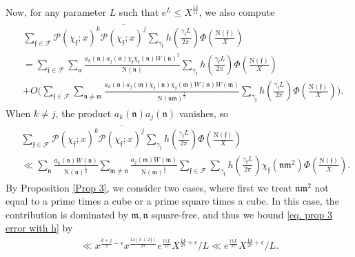 \documentclass[11pt]{amsart}
\def\n{\mathfrak{n}}
\def\m{\mathfrak{m}}
\newcommand{\norm}{\mathrm{N}}
\numberwithin{equation}{section}
\theoremstyle{remark}
\begin{document}
Now, for any parameter $L$ such that $e^L\le X^{\frac{13}{11}}$, we also compute
\begin{align}\label{eq. Pkpj with h}
\begin{split}
&\sum_{\mathfrak{f}\in\mathcal{F}} \mathcal{P}(\chi_\mathfrak{f}; x)^{k}\overline{\mathcal{P}(\chi_\mathfrak{f}; x)^{j}} 
\sum_{\gamma_\mathfrak{f}} h\left(\frac{\gamma_\mathfrak{f} L}{2\pi}\right) \Phi\left(\frac{\norm(\mathfrak{f})}{X}\right)
\\&=
\sum_{\mathfrak{f}\in\mathcal{F}}  \sum_{\n} \frac{ a_{k}(\n)a_{j}(\n)\chi_\mathfrak{f}\overline{\chi_\mathfrak{f}}(\n)W(\n)^2}{\norm(\n)}  \sum_{\gamma_\mathfrak{f}} h\left(\frac{\gamma_\mathfrak{f} L}{2\pi}\right)
\Phi\left(\frac{\norm(\mathfrak{f})}{X}\right)
\\
& +O\bigg( 
\sum_{\mathfrak{f}\in\mathcal{F}}  \sum_{\n\neq\m} \frac{ a_{k}(\n)a_{j}(\m)\chi_\mathfrak{f}(\n)
\overline{\chi_\mathfrak{f}}(\m)W(\n)W(\m)}{\norm(\n\m)^{\frac{1}{2}}}  \sum_{\gamma_\mathfrak{f}} h\left(\frac{\gamma_\mathfrak{f} L}{2\pi}\right) \Phi\left(\frac{\norm(\mathfrak{f})}{X}\right)\bigg).
\end{split}
\end{align}
When $k\ne j$, the product $a_{k}(\n)a_{j}(\n)$ vanishes, so
\begin{align}\label{eq. prop 3 error with h}
\begin{split}
    &\sum_{\mathfrak{f}\in\mathcal{F}} \mathcal{P}(\chi_\mathfrak{f}; x)^{k}\overline{\mathcal{P}(\chi_\mathfrak{f}; x)^{j}} \sum_{\gamma_\mathfrak{f}} h\left(\frac{\gamma_\mathfrak{f} L}{2\pi}\right) \Phi\left(\frac{\norm(\mathfrak{f})}{X}\right)
    \\
    &\ll
    \sum_{\n}\frac{a_k(\n)W(\n)}{\norm(\n)^{\frac{1}{2}}}
    \sum_{\m \ne \n} \frac{a_j(\m)W(\m)}{\norm(\m)^{\frac{1}{2}}}
    \sum_{\mathfrak{f}\in \mathcal{F}} \sum_{\gamma_\mathfrak{f}} h\left(\frac{\gamma_\mathfrak{f} L}{2\pi}\right)
    \chi_\mathfrak{f}(\n\m^2)
    \Phi\left(\frac{\norm(\mathfrak{f})}{X}\right).
\end{split}
\end{align}
By Proposition \ref{Prop 3}, we consider two cases, where first we treat $\n\m^2$ not equal to a prime times a cube or a prime square times a cube.
In this case, the contribution is dominated by $\m, \n$ square-free, and thus we bound \eqref{eq. prop 3 error with h} by
\begin{align}\label{eq. prop 3 error with h not prime times cube}
    \ll
  x^{\frac{k+j}{2}-\epsilon}x^{\frac{14(k+2j)}{27}}e^{\frac{11L}{27}}X^{\frac{14}{27}+\epsilon}/{L}
    \ll
    e^{\frac{11L}{27}}X^{\frac{14}{27}+\epsilon}/{L}.
\end{align}
\end{document}
